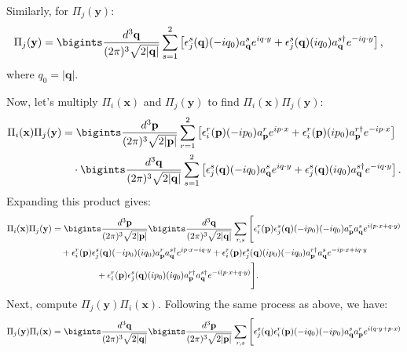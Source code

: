 \begin{enumerate}
Similarly, for $\Pi_j(\mathbf{y})$:
\begin{align}
    \Pi_j(\mathbf{y}) &= \bigints\frac{d^3 \mathbf{q}}{(2\pi)^3 \sqrt{2|\mathbf{q}|}} \sum_{s=1}^2 \left[ \epsilon_j^s(\mathbf{q}) (-i q_0) a^s_{\mathbf{q}} e^{i q \cdot y} + \epsilon_j^s(\mathbf{q}) (i q_0) a^{s\dagger}_{\mathbf{q}} e^{-i q \cdot y} \right],
\end{align}
where $q_0 = |\mathbf{q}|$.

Now, let’s multiply $\Pi_i(\mathbf{x})$ and $\Pi_j(\mathbf{y})$ to find $\Pi_i(\mathbf{x}) \Pi_j(\mathbf{y})$:
\begin{align}
    \Pi_i(\mathbf{x}) \Pi_j(\mathbf{y}) &= \bigints\frac{d^3 \mathbf{p}}{(2\pi)^3 \sqrt{2|\mathbf{p}|}} \sum_{r=1}^2 \left[ \epsilon_i^r(\mathbf{p}) (-i p_0) a^r_{\mathbf{p}} e^{i p \cdot x} + \epsilon_i^r(\mathbf{p}) (i p_0) a^{r\dagger}_{\mathbf{p}} e^{-i p \cdot x} \right] \notag \\
    &\quad \cdot \bigints\frac{d^3 \mathbf{q}}{(2\pi)^3 \sqrt{2|\mathbf{q}|}} \sum_{s=1}^2 \left[ \epsilon_j^s(\mathbf{q}) (-i q_0) a^s_{\mathbf{q}} e^{i q \cdot y} + \epsilon_j^s(\mathbf{q}) (i q_0) a^{s\dagger}_{\mathbf{q}} e^{-i q \cdot y} \right].
\end{align}
Expanding this product gives:
\begin{align}
    \Pi_i(\mathbf{x}) \Pi_j(\mathbf{y}) &= \bigints\frac{d^3 \mathbf{p}}{(2\pi)^3 \sqrt{2|\mathbf{p}|}} \bigints\frac{d^3 \mathbf{q}}{(2\pi)^3 \sqrt{2|\mathbf{q}|}} \sum_{r,s} \Bigg[ \epsilon_i^r(\mathbf{p}) \epsilon_j^s(\mathbf{q}) (-i p_0) (-i q_0) a^r_{\mathbf{p}} a^s_{\mathbf{q}} e^{i (p \cdot x + q \cdot y)} \nonumber \\
    &\quad + \epsilon_i^r(\mathbf{p}) \epsilon_j^s(\mathbf{q}) (-i p_0)(i q_0) a^r_{\mathbf{p}} a^{s\dagger}_{\mathbf{q}} e^{i p \cdot x - i q \cdot y} + \epsilon_i^r(\mathbf{p}) \epsilon_j^s(\mathbf{q}) (i p_0)(-i q_0) a^{r\dagger}_{\mathbf{p}} a^s_{\mathbf{q}} e^{-i p \cdot x + i q \cdot y} \nonumber \\
    &\hspace{50pt} + \epsilon_i^r(\mathbf{p}) \epsilon_j^s(\mathbf{q}) (i p_0)(i q_0) a^{r\dagger}_{\mathbf{p}} a^{s\dagger}_{\mathbf{q}} e^{-i (p \cdot x + q \cdot y)} \Bigg].
\end{align}
Next, compute $\Pi_j(\mathbf{y}) \Pi_i(\mathbf{x})$. Following the same process as above, we have:
\begin{align}
    \Pi_j(\mathbf{y}) \Pi_i(\mathbf{x}) &= \bigints\frac{d^3 \mathbf{q}}{(2\pi)^3 \sqrt{2|\mathbf{q}|}} \bigints\frac{d^3 \mathbf{p}}{(2\pi)^3 \sqrt{2|\mathbf{p}|}} \sum_{r,s} \Bigg[ \epsilon_j^s(\mathbf{q}) \epsilon_i^r(\mathbf{p}) (-i q_0) (-i p_0) a^s_{\mathbf{q}} a^r_{\mathbf{p}} e^{i (q \cdot y + p \cdot x)} \nonumber \\

\end{align}
\end{enumerate}
